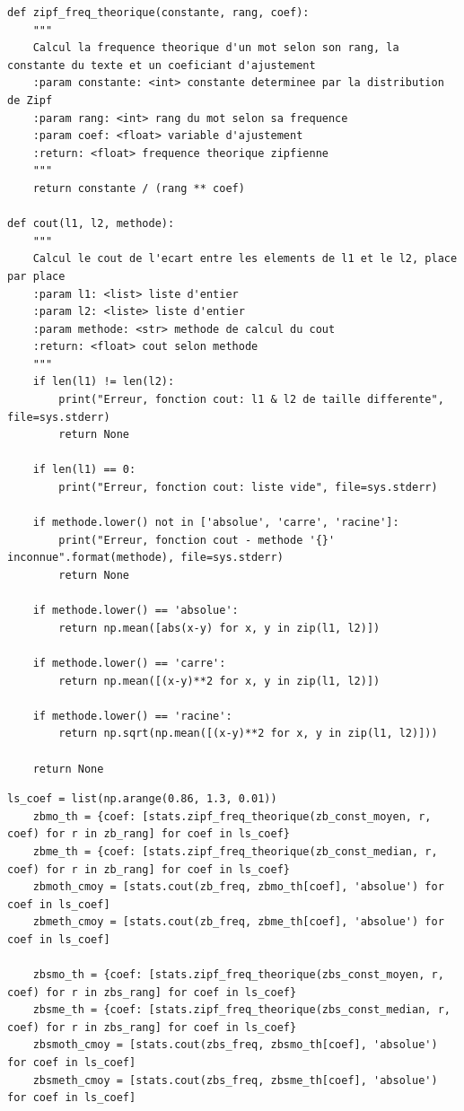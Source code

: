 \documentclass[a4paper,12pt]{article}
\begin{document}
			\begin{lstlisting}[title=Fonctions utilisées dans la recherche du coefficient]
def zipf_freq_theorique(constante, rang, coef):
    """
    Calcul la frequence theorique d'un mot selon son rang, la constante du texte et un coeficiant d'ajustement
    :param constante: <int> constante determinee par la distribution de Zipf
    :param rang: <int> rang du mot selon sa frequence
    :param coef: <float> variable d'ajustement
    :return: <float> frequence theorique zipfienne
    """
    return constante / (rang ** coef)
    
def cout(l1, l2, methode):
    """
    Calcul le cout de l'ecart entre les elements de l1 et le l2, place par place
    :param l1: <list> liste d'entier
    :param l2: <liste> liste d'entier
    :param methode: <str> methode de calcul du cout
    :return: <float> cout selon methode
    """
    if len(l1) != len(l2):
        print("Erreur, fonction cout: l1 & l2 de taille differente", file=sys.stderr)
        return None

    if len(l1) == 0:
        print("Erreur, fonction cout: liste vide", file=sys.stderr)

    if methode.lower() not in ['absolue', 'carre', 'racine']:
        print("Erreur, fonction cout - methode '{}' inconnue".format(methode), file=sys.stderr)
        return None

    if methode.lower() == 'absolue':
        return np.mean([abs(x-y) for x, y in zip(l1, l2)])

    if methode.lower() == 'carre':
        return np.mean([(x-y)**2 for x, y in zip(l1, l2)])

    if methode.lower() == 'racine':
        return np.sqrt(np.mean([(x-y)**2 for x, y in zip(l1, l2)]))

    return None\end{lstlisting}

			\begin{lstlisting}[title=Calcul des fréquences par coefficient]
    ls_coef = list(np.arange(0.86, 1.3, 0.01))
    zbmo_th = {coef: [stats.zipf_freq_theorique(zb_const_moyen, r, coef) for r in zb_rang] for coef in ls_coef}
    zbme_th = {coef: [stats.zipf_freq_theorique(zb_const_median, r, coef) for r in zb_rang] for coef in ls_coef}
    zbmoth_cmoy = [stats.cout(zb_freq, zbmo_th[coef], 'absolue') for coef in ls_coef]
    zbmeth_cmoy = [stats.cout(zb_freq, zbme_th[coef], 'absolue') for coef in ls_coef]

    zbsmo_th = {coef: [stats.zipf_freq_theorique(zbs_const_moyen, r, coef) for r in zbs_rang] for coef in ls_coef}
    zbsme_th = {coef: [stats.zipf_freq_theorique(zbs_const_median, r, coef) for r in zbs_rang] for coef in ls_coef}
    zbsmoth_cmoy = [stats.cout(zbs_freq, zbsmo_th[coef], 'absolue') for coef in ls_coef]
    zbsmeth_cmoy = [stats.cout(zbs_freq, zbsme_th[coef], 'absolue') for coef in ls_coef] \end{lstlisting}
		
\end{document}
